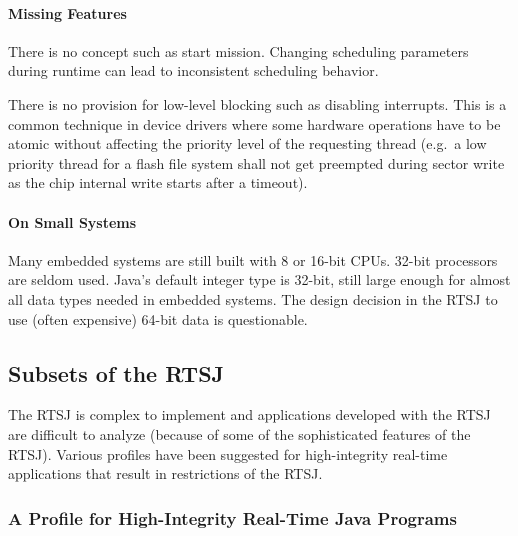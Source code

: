 \paragraph{Missing Features}

There is no concept such as start mission. Changing scheduling
parameters during runtime can lead to inconsistent scheduling
behavior.

There is no provision for low-level blocking such as disabling
interrupts. This is a common technique in device drivers where some
hardware operations have to be atomic without affecting the priority
level of the requesting thread (e.g.\ a low priority thread for a
flash file system shall not get preempted during sector write as the
chip internal write starts after a timeout).

\paragraph{On Small Systems}

Many embedded systems are still built with 8 or 16-bit CPUs. 32-bit
processors are seldom used. Java's default integer type is 32-bit,
still large enough for almost all data types needed in embedded
systems. The design decision in the RTSJ to use (often expensive)
64-bit  data is questionable.

\subsection{Subsets of the RTSJ}
\label{subsec:restr:rtsj}

The RTSJ is complex to implement and applications developed with the
RTSJ are difficult to analyze (because of some of the sophisticated
features of the RTSJ). Various profiles have been suggested for
high-integrity real-time applications that result in restrictions of
the RTSJ.

\subsubsection{A Profile for High-Integrity Real-Time Java Programs}


